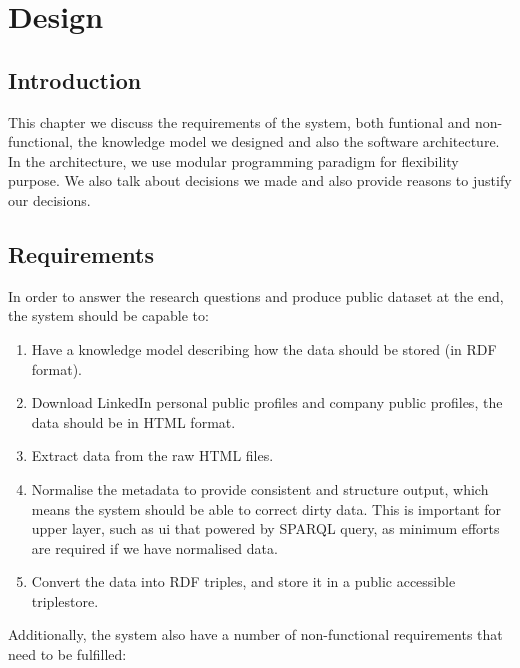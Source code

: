 \chapter{Design}

\section{Introduction}
This chapter we discuss the requirements of the system, both funtional and non-functional, the knowledge model we designed and also the software architecture. In the architecture, we use modular programming paradigm for flexibility purpose. We also talk about decisions we made and also provide reasons to justify our decisions.

\section{Requirements}
In order to answer the research questions and produce public dataset at the end, the system should be capable to:
\begin{enumerate}
	\item Have a knowledge model describing how the data should be stored (in RDF format).
	\item Download LinkedIn personal public profiles and company public profiles, the data should be in HTML format.
	\item Extract data from the raw HTML files.
	\item Normalise the metadata to provide consistent and structure output, which means the system should be able to correct dirty data. This is important for upper layer, such as \gls{ui} that powered by SPARQL query, as minimum efforts are required if we have normalised data.
	\item Convert the data into RDF triples, and store it in a public accessible triplestore.
\end{enumerate}

Additionally, the system also have a number of non-functional requirements that need to be fulfilled:

